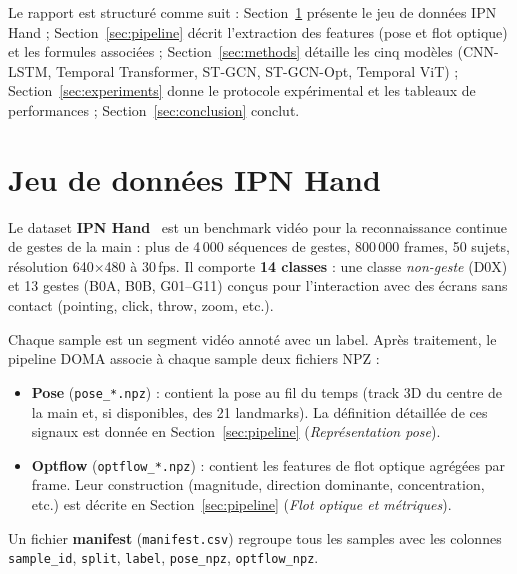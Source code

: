 \documentclass[11pt,a4paper]{article}
\begin{document}
Le rapport est structuré comme suit : Section~\ref{sec:data} présente le jeu de données IPN Hand ; Section~\ref{sec:pipeline} décrit l’extraction des features (pose et flot optique) et les formules associées ; Section~\ref{sec:methods} détaille les cinq modèles (CNN-LSTM, Temporal Transformer, ST-GCN, ST-GCN-Opt, Temporal ViT) ; Section~\ref{sec:experiments} donne le protocole expérimental et les tableaux de performances ; Section~\ref{sec:conclusion} conclut.

\section{Jeu de données IPN Hand}
\label{sec:data}

Le dataset \textbf{IPN Hand}~\cite{ipnhand} est un benchmark vidéo pour la reconnaissance continue de gestes de la main : plus de 4\,000 séquences de gestes, 800\,000 frames, 50 sujets, résolution 640$\times$480 à 30\,fps. Il comporte \textbf{14 classes} : une classe \emph{non-geste} (D0X) et 13 gestes (B0A, B0B, G01--G11) conçus pour l’interaction avec des écrans sans contact (pointing, click, throw, zoom, etc.).

Chaque sample est un segment vidéo annoté avec un label. Après traitement, le pipeline DOMA associe à chaque sample deux fichiers NPZ :

\begin{itemize}
  \item \textbf{Pose} (\texttt{pose\_*.npz}) : contient la pose au fil du temps (track 3D du centre de la main et, si disponibles, des 21 landmarks). La définition détaillée de ces signaux est donnée en Section~\ref{sec:pipeline} (\emph{Représentation pose}).
  \item \textbf{Optflow} (\texttt{optflow\_*.npz}) : contient les features de flot optique agrégées par frame. Leur construction (magnitude, direction dominante, concentration, etc.) est décrite en Section~\ref{sec:pipeline} (\emph{Flot optique et métriques}).
\end{itemize}

Un fichier \textbf{manifest} (\texttt{manifest.csv}) regroupe tous les samples avec les colonnes \texttt{sample\_id}, \texttt{split}, \texttt{label}, \texttt{pose\_npz}, \texttt{optflow\_npz}.

\end{document}
